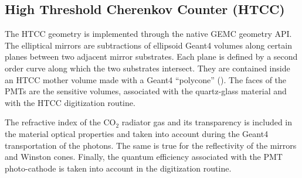 \subsection{High Threshold Cherenkov Counter (HTCC)}

The HTCC geometry is implemented through the native GEMC geometry API. The elliptical mirrors are subtractions of
ellipsoid Geant4 volumes along certain planes between two adjacent mirror substrates. Each plane is defined by a second order
curve along which the two substrates intersect.
They are contained inside an HTCC mother volume made with a Geant4 ``polycone'' ().
The faces of the PMTs are the sensitive volumes, associated with the quartz-glass material and with the HTCC digitization routine.

The refractive index of the CO$_2$ radiator gas and its transparency is included in the material optical properties and taken
into account during the Geant4 transportation of the photons. The same is true for the reflectivity of the mirrors and Winston cones.
Finally, the quantum efficiency associated with the PMT photo-cathode is taken into account in
the digitization routine.


